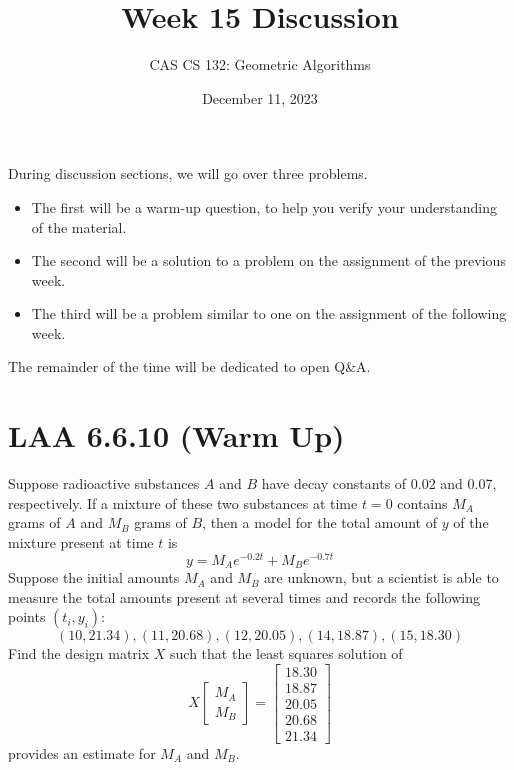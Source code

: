 \documentclass{article}
\title{
  Week 15 Discussion
}
\author{CAS CS 132: Geometric Algorithms}
\date{December 11, 2023}
\theoremstyle{remark}
\begin{document}
\maketitle

\noindent During discussion sections, we will go over three problems.
\begin{itemize}
\item
  The first will be a warm-up question, to help you verify your
  understanding of the material.
\item
  The second will be a solution to a problem on the assignment of
  the previous week.
\item
  The third will be a problem similar to one on the assignment of the
  following week.
\end{itemize}
The remainder of the time will be dedicated to open Q\&A.

\pagebreak
\section{LAA 6.6.10 (Warm Up)}

Suppose radioactive substances $A$ and $B$ have decay constants of
0.02 and 0.07, respectively. If a mixture of these two substances at
time $t = 0$ contains $M_A$ grams of $A$ and $M_B$ grams of $B$, then
a model for the total amount of $y$ of the mixture present at time $t$
is
\begin{displaymath}
  y = M_A e^{-0.2t} + M_B e^{-0.7t}
\end{displaymath}
Suppose the initial amounts $M_A$ and $M_B$ are unknown, but a
scientist is able to measure the total amounts present at several
times and records the following points $(t_i, y_i)$:
\begin{displaymath}
  (10, 21.34), (11, 20.68), (12, 20.05), (14, 18.87), (15, 18.30)
\end{displaymath}
Find the design matrix $X$ such that the least squares solution of
\begin{displaymath}
  X
  \begin{bmatrix}
    M_A \\ M_B
  \end{bmatrix}
  =
  \begin{bmatrix}
    18.30 \\
    18.87 \\
    20.05 \\
    20.68 \\
    21.34
  \end{bmatrix}
\end{displaymath}
provides an estimate for $M_A$ and $M_B$.
\end{document}
